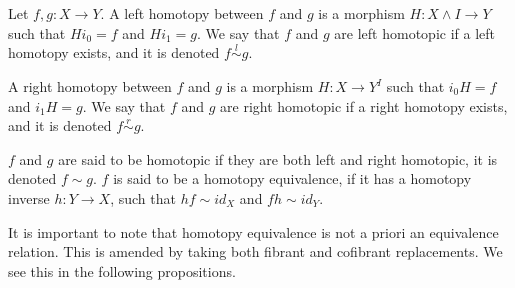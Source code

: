 \documentclass[../thesis.tex]{subfiles}
\begin{document}
            \begin{definition}
                Let $f,g: X\rightarrow Y$. A left homotopy between $f$ and $g$ is a morphism $H:X\wedge I \rightarrow Y$ such that $Hi_0 = f$ and $Hi_1 = g$. We say that $f$ and $g$ are left homotopic if a left homotopy exists, and it is denoted $f \overset{l}{\sim} g$.

                \begin{center}
                \end{center}
                
                A right homotopy between $f$ and $g$ is a morphism $H: X \rightarrow Y^I$ such that $i_0H = f$ and $i_1H = g$. We say that $f$ and $g$ are right homotopic if a right homotopy exists, and it is denoted $f \overset{r}{\sim} g$.

                \begin{center}
                \end{center}

                $f$ and $g$ are said to be homotopic if they are both left and right homotopic, it is denoted $f \sim g$. $f$ is said to be a homotopy equivalence, if it has a homotopy inverse $h: Y \rightarrow X$, such that $hf \sim id_X$ and $fh \sim id_Y$. 
            \end{definition}

            It is important to note that homotopy equivalence is not a priori an equivalence relation. This is amended by taking both fibrant and cofibrant replacements. We see this in the following propositions.
\end{document}
